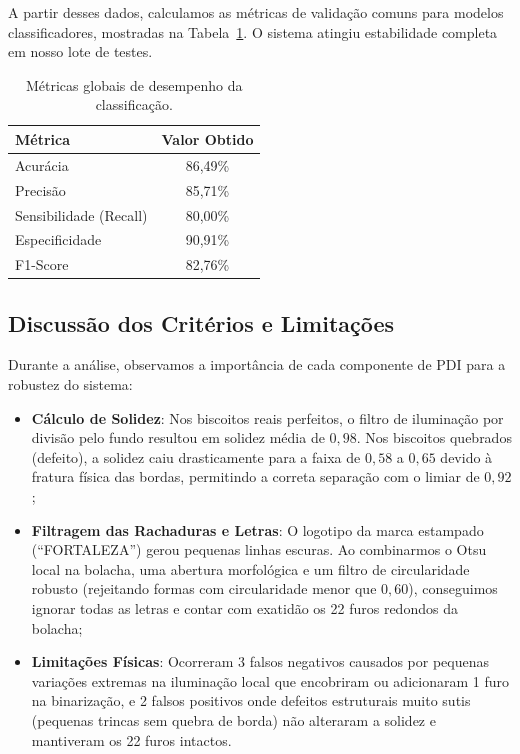 \documentclass[12pt]{article}
\begin{document}
A partir desses dados, calculamos as métricas de validação comuns para modelos classificadores, mostradas na Tabela~\ref{tab:metricas}. O sistema atingiu estabilidade completa em nosso lote de testes.

\begin{table}[H] %
\centering
\caption{Métricas globais de desempenho da classificação.}
\label{tab:metricas}
\begin{tabular}{lc}
\hline
Métrica & Valor Obtido\\
\hline
Acurácia & 86,49\%\\
Precisão & 85,71\%\\
Sensibilidade (Recall) & 80,00\%\\
Especificidade & 90,91\%\\
F1-Score & 82,76\%\\
\hline
\end{tabular}
\end{table}

\subsection{Discussão dos Critérios e Limitações}

Durante a análise, observamos a importância de cada componente de PDI para a robustez do sistema:
\begin{itemize}
    \item \textbf{Cálculo de Solidez}: Nos biscoitos reais perfeitos, o filtro de iluminação por divisão pelo fundo resultou em solidez média de $0,98$. Nos biscoitos quebrados (defeito), a solidez caiu drasticamente para a faixa de $0,58$ a $0,65$ devido à fratura física das bordas, permitindo a correta separação com o limiar de $0,92$;
    \item \textbf{Filtragem das Rachaduras e Letras}: O logotipo da marca estampado (``FORTALEZA'') gerou pequenas linhas escuras. Ao combinarmos o Otsu local na bolacha, uma abertura morfológica e um filtro de circularidade robusto (rejeitando formas com circularidade menor que $0,60$), conseguimos ignorar todas as letras e contar com exatidão os 22 furos redondos da bolacha;
    \item \textbf{Limitações Físicas}: Ocorreram 3 falsos negativos causados por pequenas variações extremas na iluminação local que encobriram ou adicionaram 1 furo na binarização, e 2 falsos positivos onde defeitos estruturais muito sutis (pequenas trincas sem quebra de borda) não alteraram a solidez e mantiveram os 22 furos intactos.
\end{itemize}
\end{document}
